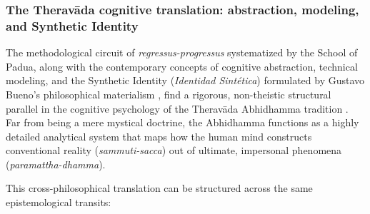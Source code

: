 \documentclass[11pt, a4paper]{article}
\begin{document}
\subsubsection*{The Theravāda cognitive translation: abstraction, modeling, and Synthetic Identity}

The methodological circuit of \textit{regressus-progressus} systematized by the School of Padua, along with the contemporary concepts of cognitive abstraction, technical modeling, and the \textrm{Synthetic Identity} (\textit{Identidad Sintética}) formulated by Gustavo Bueno's philosophical materialism \cite{Bueno1992cierre}, find a rigorous, non-theistic structural parallel in the cognitive psychology of the \textrm{Theravāda Abhidhamma} tradition \cite{bodhi1993comprehensive}. Far from being a mere mystical doctrine, the Abhidhamma functions as a highly detailed analytical system that maps how the human mind constructs conventional reality (\textit{sammuti-sacca}) out of ultimate, impersonal phenomena (\textit{paramattha-dhamma}).

This cross-philosophical translation can be structured across the same epistemological transits:
\end{document}
